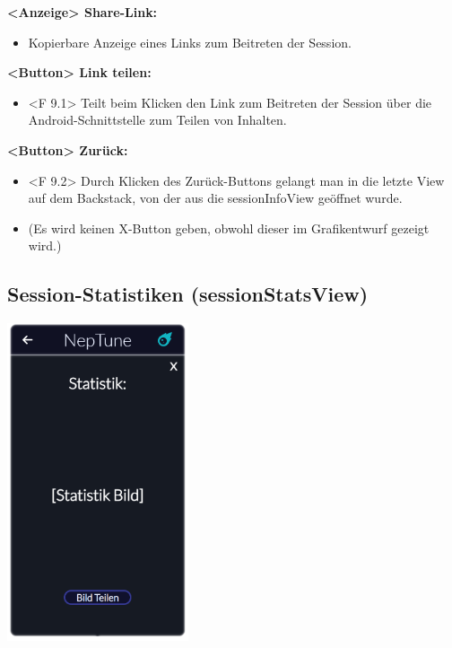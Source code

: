 \documentclass[oneside, ngerman]{sdqtechreport}
\begin{document}
\textbf{<Anzeige> Share-Link:}
\begin{itemize}
    \item Kopierbare Anzeige eines Links zum Beitreten der Session.
\end{itemize}

\textbf{<Button> Link teilen:}
\begin{itemize}
    \item <F 9.1> Teilt beim Klicken den Link zum Beitreten der Session über die Android-Schnittstelle zum Teilen von Inhalten.
\end{itemize}

\textbf{<Button> Zurück:}
\begin{itemize}
    \item <F 9.2> Durch Klicken des Zurück-Buttons gelangt man in die letzte View auf dem Backstack, von der aus die sessionInfoView geöffnet wurde.
    \item (Es wird keinen X-Button geben, obwohl dieser im Grafikentwurf gezeigt wird.)
\end{itemize}


\subsection{Session-Statistiken (sessionStatsView)}
\label{sec:Benutzeroberfläche:sessionStatsView}


\begin{center}
    \hypertarget{sessionStatsView}{}
    \includegraphics[width=0.4\textwidth]{LATEX/Pflichtenheft/GraphicDesigns/statisticsPopUpPage.png}
\end{center}
\end{document}
